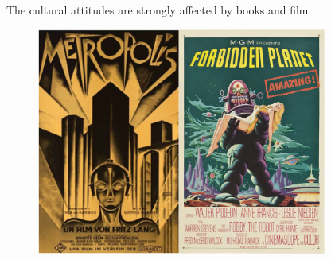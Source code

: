 The cultural attitudes are strongly affected by books and film:

\begin{figure}
\centering
\includegraphics[width=0.85\textwidth,height=\textheight]{IntroductionFigures/poster1.png}
\caption{}
\end{figure}
